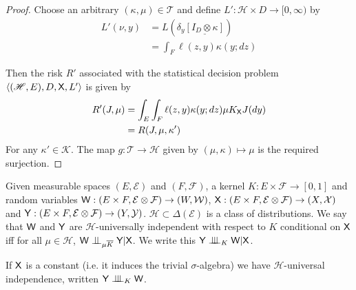 \begin{proof}


Choose an arbitrary $(\kappa,\mu)\in\mathscr{T}$ and define $L':\mathscr{H}\times D\to [0,\infty)$ by
\begin{align}
    L'(\nu,y) &= L(\delta_y\underline{[I_D\otimes \kappa]})\\
              &= \int_F \ell(z,y) \kappa(y;dz)
\end{align}

Then the risk $R'$ associated with the statistical decision problem $\langle (\mathscr{H},E),D,\mathsf{X},L'\rangle$ is given by 
\begin{align}
    R'(J,\mu) &= \int_E \int_F \ell(z,y)  \kappa (y;dz) \mu K_{\mathsf{X}} J(dy)\\
              &= R(J,\mu,\kappa')
\end{align}
For any $\kappa'\in\mathscr{K}$. The map $g:\mathscr{T}\to\mathscr{H}$ given by $(\mu,\kappa)\mapsto \mu$ is the required surjection.
\end{proof}


\begin{definition}\label{def:univ_indep}
Given measurable spaces $(E,\mathcal{E})$ and $(F,\mathcal{F})$, a kernel $K:E\times\mathcal{F}\to[0,1]$ and random variables $\mathsf{W}:(E\times F,\mathcal{E}\otimes\mathcal{F})\to (W,\mathcal{W})$, $\mathsf{X}:(E\times F,\mathcal{E}\otimes\mathcal{F})\to (X,\mathcal{X})$ and $\mathsf{Y}:(E\times F,\mathcal{E}\otimes \mathcal{F})\to (Y,\mathcal{Y})$. $\mathscr{H}\subset\Delta(\mathcal{E})$ is a class of distributions. We say that $\mathsf{W}$ and $\mathsf{Y}$ are $\mathscr{H}$-universally independent with respect to $K$ conditional on $\mathsf{X}$ iff for all $\mu\in \mathscr{H}$, $\RV{W}\CI_{\mu \overline{K}} \RV{Y} |\RV{X}$. We write this $\RV{Y} \CII_K \RV{W} | \RV{X}$. 

If $\mathsf{X}$ is a constant (i.e. it induces the trivial $\sigma$-algebra) we have $\mathscr{H}$-universal independence, written $\RV{Y}\CII_K \RV{W}$.
\end{definition}